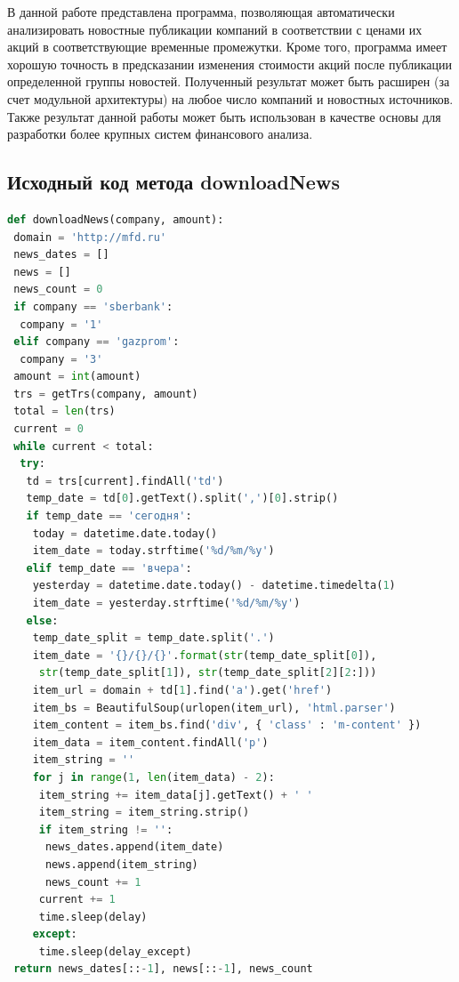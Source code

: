 \documentclass[14pt]{matmex-diploma-custom}
\begin{document}
В данной работе представлена программа, позволяющая автоматически анализировать новостные публикации компаний в соответствии с ценами их акций в соответствующие временные промежутки. Кроме того, программа имеет хорошую точность в предсказании изменения стоимости акций после публикации определенной группы новостей. Полученный результат может быть расширен (за счет модульной архитектуры) на любое число компаний и новостных источников. Также результат данной работы может быть использован в качестве основы для разработки более крупных систем финансового анализа.

\setmonofont[Mapping=tex-text]{CMU Typewriter Text}



\begin{appendices}

\section{Исходный код метода downloadNews}

\label{app:downloadNews}

\begin{footnotesize}
\begin{lstlisting}[language=Python]
def downloadNews(company, amount):
 domain = 'http://mfd.ru'
 news_dates = []
 news = []
 news_count = 0
 if company == 'sberbank':
  company = '1'
 elif company == 'gazprom':
  company = '3'
 amount = int(amount)
 trs = getTrs(company, amount)
 total = len(trs)
 current = 0
 while current < total:
  try:
   td = trs[current].findAll('td')
   temp_date = td[0].getText().split(',')[0].strip()
   if temp_date == 'сегодня':
    today = datetime.date.today()
    item_date = today.strftime('%d/%m/%y')
   elif temp_date == 'вчера':
    yesterday = datetime.date.today() - datetime.timedelta(1)
    item_date = yesterday.strftime('%d/%m/%y')
   else:
    temp_date_split = temp_date.split('.')
    item_date = '{}/{}/{}'.format(str(temp_date_split[0]),
     str(temp_date_split[1]), str(temp_date_split[2][2:]))
    item_url = domain + td[1].find('a').get('href')
    item_bs = BeautifulSoup(urlopen(item_url), 'html.parser')
    item_content = item_bs.find('div', { 'class' : 'm-content' })
    item_data = item_content.findAll('p')
    item_string = ''
    for j in range(1, len(item_data) - 2):
     item_string += item_data[j].getText() + ' '
     item_string = item_string.strip()
     if item_string != '':
      news_dates.append(item_date)
      news.append(item_string)
      news_count += 1
     current += 1
     time.sleep(delay)
    except:
     time.sleep(delay_except)
 return news_dates[::-1], news[::-1], news_count
\end{lstlisting}
\end{footnotesize}


\end{appendices}
\end{document}
